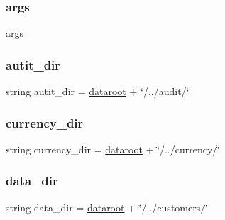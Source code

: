\mbox{\label{namespacedibagui_a8187411843a6284ffb964ef3fb9fcab3}} 
\subsubsection{\texorpdfstring{args}{args}}
{\footnotesize\ttfamily args}

\mbox{\label{namespacedibagui_a118b1aec766aad00e7a9b1af8ecee060}} 
\subsubsection{\texorpdfstring{autit\+\_\+dir}{autit\_dir}}
{\footnotesize\ttfamily string autit\+\_\+dir = \hyperlink{namespacedibagui_a5cdafc01cb2d85e5af4a95537b9713de}{dataroot} + \char`\"{}/../audit/\char`\"{}}

\mbox{\label{namespacedibagui_a0182fb6d799f924051fc39db43ac050d}} 
\subsubsection{\texorpdfstring{currency\+\_\+dir}{currency\_dir}}
{\footnotesize\ttfamily string currency\+\_\+dir = \hyperlink{namespacedibagui_a5cdafc01cb2d85e5af4a95537b9713de}{dataroot} + \char`\"{}/../currency/\char`\"{}}

\mbox{\label{namespacedibagui_a5437a7caa57bba3f6e4d82d92bafd787}} 
\subsubsection{\texorpdfstring{data\+\_\+dir}{data\_dir}}
{\footnotesize\ttfamily string data\+\_\+dir = \hyperlink{namespacedibagui_a5cdafc01cb2d85e5af4a95537b9713de}{dataroot} + \char`\"{}/../customers/\char`\"{}}

\mbox{\label{namespacedibagui_a5cdafc01cb2d85e5af4a95537b9713de}} 

